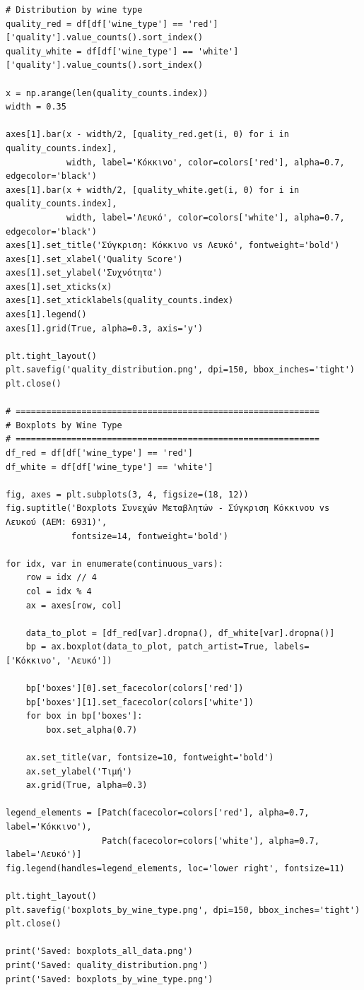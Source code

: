 \documentclass[12pt,a4paper]{article}
\begin{document}
\begin{lstlisting}
# Distribution by wine type
quality_red = df[df['wine_type'] == 'red']['quality'].value_counts().sort_index()
quality_white = df[df['wine_type'] == 'white']['quality'].value_counts().sort_index()

x = np.arange(len(quality_counts.index))
width = 0.35

axes[1].bar(x - width/2, [quality_red.get(i, 0) for i in quality_counts.index], 
            width, label='Κόκκινο', color=colors['red'], alpha=0.7, edgecolor='black')
axes[1].bar(x + width/2, [quality_white.get(i, 0) for i in quality_counts.index], 
            width, label='Λευκό', color=colors['white'], alpha=0.7, edgecolor='black')
axes[1].set_title('Σύγκριση: Κόκκινο vs Λευκό', fontweight='bold')
axes[1].set_xlabel('Quality Score')
axes[1].set_ylabel('Συχνότητα')
axes[1].set_xticks(x)
axes[1].set_xticklabels(quality_counts.index)
axes[1].legend()
axes[1].grid(True, alpha=0.3, axis='y')

plt.tight_layout()
plt.savefig('quality_distribution.png', dpi=150, bbox_inches='tight')
plt.close()

# ============================================================
# Boxplots by Wine Type
# ============================================================
df_red = df[df['wine_type'] == 'red']
df_white = df[df['wine_type'] == 'white']

fig, axes = plt.subplots(3, 4, figsize=(18, 12))
fig.suptitle('Boxplots Συνεχών Μεταβλητών - Σύγκριση Κόκκινου vs Λευκού (ΑΕΜ: 6931)',
             fontsize=14, fontweight='bold')

for idx, var in enumerate(continuous_vars):
    row = idx // 4
    col = idx % 4
    ax = axes[row, col]

    data_to_plot = [df_red[var].dropna(), df_white[var].dropna()]
    bp = ax.boxplot(data_to_plot, patch_artist=True, labels=['Κόκκινο', 'Λευκό'])

    bp['boxes'][0].set_facecolor(colors['red'])
    bp['boxes'][1].set_facecolor(colors['white'])
    for box in bp['boxes']:
        box.set_alpha(0.7)

    ax.set_title(var, fontsize=10, fontweight='bold')
    ax.set_ylabel('Τιμή')
    ax.grid(True, alpha=0.3)

legend_elements = [Patch(facecolor=colors['red'], alpha=0.7, label='Κόκκινο'),
                   Patch(facecolor=colors['white'], alpha=0.7, label='Λευκό')]
fig.legend(handles=legend_elements, loc='lower right', fontsize=11)

plt.tight_layout()
plt.savefig('boxplots_by_wine_type.png', dpi=150, bbox_inches='tight')
plt.close()

print('Saved: boxplots_all_data.png')
print('Saved: quality_distribution.png')
print('Saved: boxplots_by_wine_type.png')
\end{lstlisting}
\end{document}
